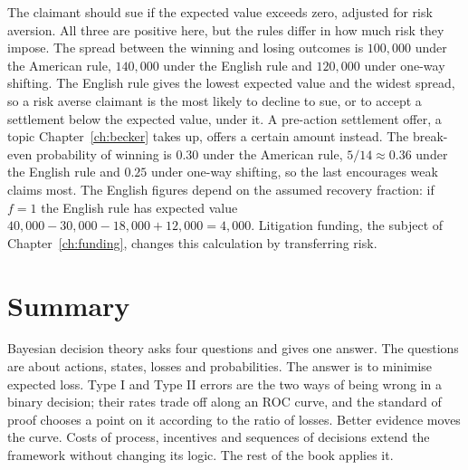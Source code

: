 The claimant should sue if the expected value exceeds zero, adjusted for risk aversion. All three are positive here, but the rules differ in how much risk they impose. The spread between the winning and losing outcomes is $100{,}000$ under the American rule, $140{,}000$ under the English rule and $120{,}000$ under one-way shifting. The English rule gives the lowest expected value and the widest spread, so a risk averse claimant is the most likely to decline to sue, or to accept a settlement below the expected value, under it. A pre-action settlement offer, a topic Chapter~\ref{ch:becker} takes up, offers a certain amount instead. The break-even probability of winning is $0.30$ under the American rule, $5/14 \approx 0.36$ under the English rule and $0.25$ under one-way shifting, so the last encourages weak claims most. The English figures depend on the assumed recovery fraction: if $f = 1$ the English rule has expected value $40{,}000 - 30{,}000 - 18{,}000 + 12{,}000 = 4{,}000$. Litigation funding, the subject of Chapter~\ref{ch:funding}, changes this calculation by transferring risk.

\section{Summary}

Bayesian decision theory asks four questions and gives one answer. The questions are about actions, states, losses and probabilities. The answer is to minimise expected loss. Type I and Type II errors are the two ways of being wrong in a binary decision; their rates trade off along an ROC curve, and the standard of proof chooses a point on it according to the ratio of losses. Better evidence moves the curve. Costs of process, incentives and sequences of decisions extend the framework without changing its logic. The rest of the book applies it.


